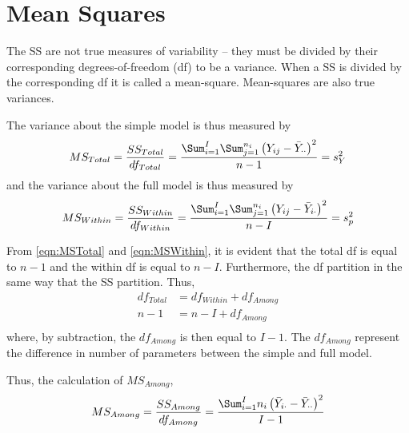 \documentclass[10pt,openany]{book}\usepackage[]{graphicx}\usepackage[]{color}
\begin{document}


\section{Mean Squares} \label{sec:MS}
The SS are not true measures of variability -- they must be divided by their corresponding degrees-of-freedom (df) to be a variance.  When a SS is divided by the corresponding df it is called a mean-square.  Mean-squares are also true variances.


The variance about the simple model is thus measured by
\begin{equation}\label{eqn:MSTotal}
  MS_{Total} = \frac{SS_{Total}}{df_{Total}} = \frac{\Sum_{i=1}^{I}\Sum_{j=1}^{n_{i}}\left(Y_{ij}-\bar{Y}_{\cdot\cdot}\right)^{2}}{n-1} = s_{Y}^{2}
\end{equation}
and the variance about the full model is thus measured by
\begin{equation}\label{eqn:MSWithin}
  MS_{Within} = \frac{SS_{Within}}{df_{Within}} = \frac{\Sum_{i=1}^{I}\Sum_{j=1}^{n_{i}}\left(Y_{ij}-\bar{Y}_{i\cdot}\right)^{2}}{n-I} = s_{p}^{2}
\end{equation}

From \eqref{eqn:MSTotal} and \eqref{eqn:MSWithin}, it is evident that the total df is equal to $n-1$ and the within df is equal to $n-I$.  Furthermore, the df partition in the same way that the SS partition.  Thus,
\[ \begin{split}
  df_{Total} &= df_{Within} + df_{Among} \\
  n-1 &= n-I + df_{Among} \\
\end{split} \]
where, by subtraction, the $df_{Among}$ is then equal to $I-1$.  The $df_{Among}$ represent the difference in number of parameters between the simple and full model.


Thus, the calculation of $MS_{Among}$,
\begin{equation}\label{eqn:MSAmong}
  MS_{Among} = \frac{SS_{Among}}{df_{Among}} = \frac{\Sum_{i=1}^{I}n_{i}\left(\bar{Y}_{i\cdot}-\bar{Y}_{\cdot\cdot}\right)^{2}}{I-1}
\end{equation}
\end{document}
